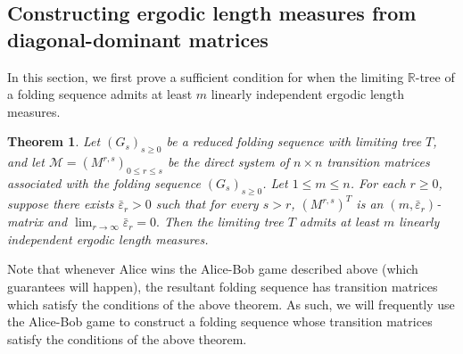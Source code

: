\documentclass[11pt, letterpaper]{amsart}
\theoremstyle{plain}
\newtheorem{theorem}{Theorem}[section]
\theoremstyle{definition}
\newcommand{\calM}{\mathcal{M}}
\renewcommand{\epsilon}{\varepsilon}
\begin{document}
\subsection{Constructing ergodic length measures from diagonal-dominant matrices}

In this section, we first prove a sufficient condition for when the limiting $\mathbb{R}$-tree of a folding sequence admits at least $m$ linearly independent ergodic length measures.

\begin{theorem} \label{thm:klp_then_ergodic_folding}
Let $(G_s)_{s \ge 0}$ be a reduced folding sequence with limiting tree $T$, and let $\calM =
(M^{r,s})_{0 \le r \le s}$ be the direct system of $n \times n$ transition matrices associated with the folding sequence $(G_s)_{s \ge 0}$. Let $1
\le m \le n$.
For each $r \geq 0$, suppose there exists $\bar\epsilon_r > 0$ such that for every $s > r$, $(M^{r,s})^T$ is an $(m, \bar\epsilon_r)$-matrix and $\lim_{r\to \infty}\bar\epsilon_r = 0.$
Then the limiting
tree $T$ admits at least $m$ linearly independent ergodic length measures.
\end{theorem}

Note that whenever Alice wins the Alice-Bob game described above (which  guarantees will happen), the resultant folding sequence has transition matrices which satisfy the conditions of the above theorem. As such, we will frequently use the Alice-Bob game to construct a folding sequence whose transition matrices satisfy the conditions of the above theorem. 
\end{document}

